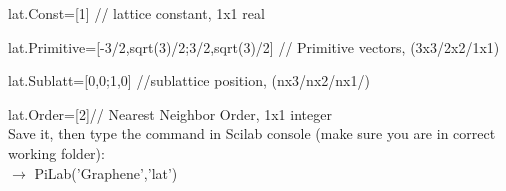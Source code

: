 \documentclass[10pt,a4paper]{article}
\begin{document}
lat.Const=[1]  \qquad \qquad \qquad \qquad \qquad \qquad \qquad  // lattice constant, 1x1 real 

lat.Primitive=[-3/2,sqrt(3)/2;3/2,sqrt(3)/2] \quad // Primitive vectors, (3x3/2x2/1x1)

lat.Sublatt=[0,0;1,0] \qquad \qquad \qquad \qquad \qquad \quad //sublattice position, (nx3/nx2/nx1/)

lat.Order=[2]\qquad \qquad \qquad \qquad \qquad \qquad \qquad // Nearest Neighbor Order, 1x1 integer \\

Save it, then type the command in Scilab console (make sure you are in correct working folder):\\

$\rightarrow$ PiLab('Graphene','lat')\\
\end{document}
